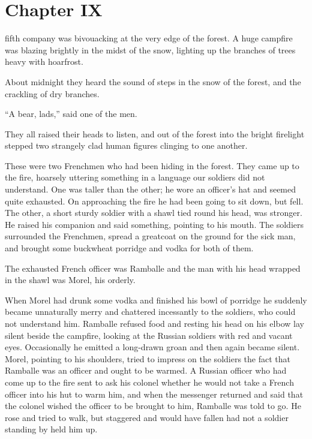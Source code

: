 \chapter*{Chapter IX}
\ifaudio 
{}
\fi

 fifth company was bivouacking at the very edge of the
forest. A huge campfire was blazing brightly in the midst of the
snow, lighting up the branches of trees heavy with hoarfrost.

About midnight they heard the sound of steps in the snow of the
forest, and the crackling of dry branches.

``A bear, lads,'' said one of the men.

They all raised their heads to listen, and out of the forest into
the bright firelight stepped two strangely clad human figures
clinging to one another.

These were two Frenchmen who had been hiding in the forest. They
came up to the fire, hoarsely uttering something in a language
our soldiers did not understand. One was taller than the other;
he wore an officer's hat and seemed quite exhausted. On
approaching the fire he had been going to sit down, but fell. The
other, a short sturdy soldier with a shawl tied round his head,
was stronger. He raised his companion and said something,
pointing to his mouth. The soldiers surrounded the Frenchmen,
spread a greatcoat on the ground for the sick man, and brought
some buckwheat porridge and vodka for both of them.

The exhausted French officer was Ramballe and the man with his
head wrapped in the shawl was Morel, his orderly.

When Morel had drunk some vodka and finished his bowl of porridge
he suddenly became unnaturally merry and chattered incessantly to
the soldiers, who could not understand him. Ramballe refused food
and resting his head on his elbow lay silent beside the campfire,
looking at the Russian soldiers with red and vacant
eyes. Occasionally he emitted a long-drawn groan and then again
became silent. Morel, pointing to his shoulders, tried to impress
on the soldiers the fact that Ramballe was an officer and ought
to be warmed. A Russian officer who had come up to the fire sent
to ask his colonel whether he would not take a French officer
into his hut to warm him, and when the messenger returned and
said that the colonel wished the officer to be brought to him,
Ramballe was told to go. He rose and tried to walk, but staggered
and would have fallen had not a soldier standing by held him up.


